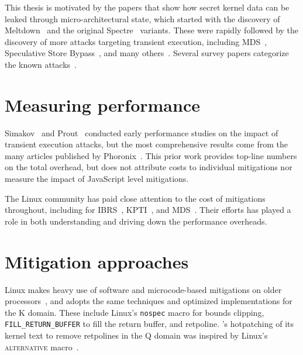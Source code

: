 \label{s:related}

This thesis is motivated by the papers that show how secret kernel data
can be leaked through micro-architectural state, which started with the discovery of Meltdown~\cite{lipp:meltdown} and the original Spectre~\cite{kocher:spectre} variants.
These were rapidly followed by the discovery of more attacks targeting transient execution, including MDS~\cite{canella:fallout,schwarz:zombieload,schaik:ridl}, Speculative Store Bypass~\cite{horn:speculative-store-bypass}, and many others~\cite{bhattacharyya:smotherspectre,bulck:foreshadow,chen:sgxspectre,koruyeh:spectrersb,ragab:crosstalk,stecklina:lazyfp,schaik:cacheout,weisse:foreshadow-ng, bulck:lvi}.
Several survey papers categorize the known attacks~\cite{hill:survey,sok:transient,xiong:survey}.

\section{Measuring performance}

Simakov~\cite{nikolay:meltdown-spectre-performance} and Prout~\cite{prout:measuring-spectre-meltdown} conducted early performance studies on the impact of transient execution attacks, but the most comprehensive results come from the many articles published by Phoronix~\cite{phoronix:perf-zombieload, phoronix:two-years, phoronix:three-years}.
This prior work provides top-line numbers on the total overhead, but does not attribute costs to individual mitigations nor measure the impact of JavaScript level mitigations.

The Linux community has paid close attention to the cost of mitigations throughout, including for IBRS~\cite{linus:ibrs-rant},  KPTI~\cite{gregg:kpti-perfromance}, and MDS~\cite{phoronix:perf-zombieload}.
Their efforts has played a role in both understanding and driving down the performance overheads.

\section{Mitigation approaches}

Linux makes heavy use of software and microcode-based mitigations on older processors~\cite{linux:vuln}, and \sys adopts the same techniques and optimized implementations for the K domain.
These include Linux's \texttt{nospec} macro for bounds clipping, \texttt{FILL\_RETURN\_BUFFER} to fill the return buffer, and retpoline.
\sys's hotpatching of its kernel text to remove retpolines in the Q
domain was inspired by Linux's \textsc{alternative}
macro~\cite{lwn:alternative}.

